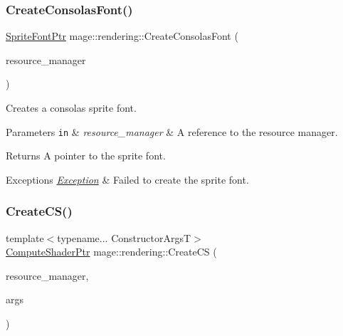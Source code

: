 \subsubsection{\texorpdfstring{Create\+Consolas\+Font()}{CreateConsolasFont()}}
{\footnotesize\ttfamily \mbox{\hyperlink{namespacemage_1_1rendering_ab2f34196c20422ca3692ad3f3bff3a5d}{Sprite\+Font\+Ptr}} mage\+::rendering\+::\+Create\+Consolas\+Font (\begin{DoxyParamCaption}\item[{\mbox{\hyperlink{classmage_1_1rendering_1_1_resource_manager}{Resource\+Manager}} \&}]{resource\+\_\+manager }\end{DoxyParamCaption})}

Creates a consolas sprite font.


\begin{DoxyParams}[1]{Parameters}
\mbox{\tt in}  & {\em resource\+\_\+manager} & A reference to the resource manager. \\
\hline
\end{DoxyParams}
\begin{DoxyReturn}{Returns}
A pointer to the sprite font. 
\end{DoxyReturn}

\begin{DoxyExceptions}{Exceptions}
{\em \mbox{\hyperlink{classmage_1_1_exception}{Exception}}} & Failed to create the sprite font. \\
\hline
\end{DoxyExceptions}
\mbox{\label{namespacemage_1_1rendering_abb0bc5a4c029c66cbf2f47ad6c1a692b}} 
\subsubsection{\texorpdfstring{Create\+C\+S()}{CreateCS()}}
{\footnotesize\ttfamily template$<$typename... Constructor\+ArgsT$>$ \\
\mbox{\hyperlink{namespacemage_1_1rendering_ab3dc9f2114f2e9255b91d9c051da52ea}{Compute\+Shader\+Ptr}} mage\+::rendering\+::\+Create\+CS (\begin{DoxyParamCaption}\item[{\mbox{\hyperlink{classmage_1_1rendering_1_1_resource_manager}{Resource\+Manager}} \&}]{resource\+\_\+manager,  }\item[{Constructor\+ArgsT \&\&...}]{args }\end{DoxyParamCaption})}

